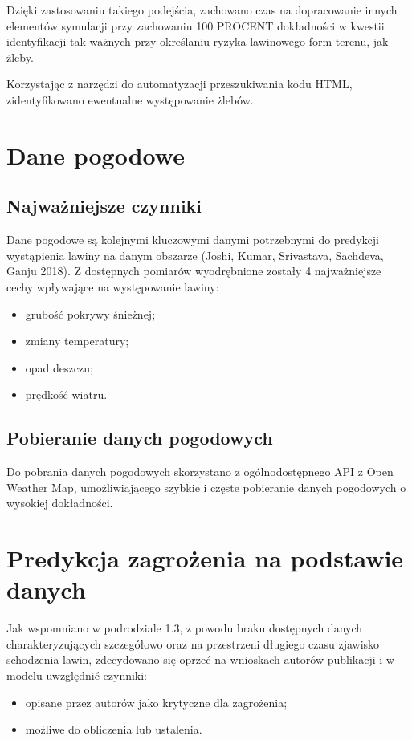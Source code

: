 Dzięki zastosowaniu takiego podejścia, zachowano czas na dopracowanie innych elementów symulacji przy zachowaniu 100 PROCENT dokładności w kwestii identyfikacji tak ważnych przy określaniu ryzyka lawinowego form terenu, jak żleby.
 
Korzystając z narzędzi do automatyzacji przeszukiwania kodu HTML, zidentyfikowano ewentualne występowanie żlebów. 



\section{Dane pogodowe}

\subsection{Najważniejsze czynniki}
Dane pogodowe są kolejnymi kluczowymi danymi potrzebnymi do predykcji wystąpienia lawiny na danym obszarze (Joshi, Kumar, Srivastava, Sachdeva, Ganju 2018). Z dostępnych pomiarów wyodrębnione zostały 4 najważniejsze cechy wpływające na występowanie lawiny:
\begin{itemize}
	\item grubość pokrywy śnieżnej;
	\item zmiany temperatury;
	\item opad deszczu;
	\item prędkość wiatru.
\end{itemize}

\subsection{Pobieranie danych pogodowych}
Do pobrania danych pogodowych skorzystano z ogólnodostępnego API z Open Weather Map, umożliwiającego szybkie i częste pobieranie danych pogodowych o wysokiej dokładności.


\section{Predykcja zagrożenia na podstawie danych}
Jak wspomniano w podrodziale 1.3, z powodu braku dostępnych danych charakteryzujących szczegółowo oraz na przestrzeni długiego czasu zjawisko schodzenia lawin, zdecydowano się oprzeć na wnioskach autorów publikacji i w modelu uwzględnić czynniki:
\begin{itemize}
	\item opisane przez autorów jako krytyczne dla zagrożenia;
	\item możliwe do obliczenia lub ustalenia.
\end{itemize}

